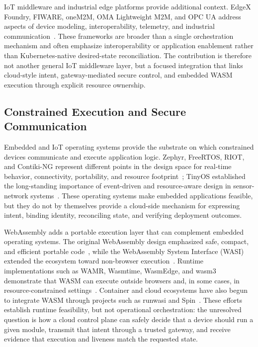 IoT middleware and industrial edge platforms provide additional context. EdgeX Foundry, FIWARE, oneM2M, OMA Lightweight M2M, and OPC UA address aspects of device modeling, interoperability, telemetry, and industrial communication~\cite{edgex,fiware,onem2m,lwm2m,opcua}. These frameworks are broader than a single orchestration mechanism and often emphasize interoperability or application enablement rather than Kubernetes-native desired-state reconciliation. The contribution is therefore not another general IoT middleware layer, but a focused integration that links cloud-style intent, gateway-mediated secure control, and embedded WASM execution through explicit resource ownership.

\subsection{Constrained Execution and Secure Communication}
Embedded and IoT operating systems provide the substrate on which constrained devices communicate and execute application logic. Zephyr, FreeRTOS, RIOT, and Contiki-NG represent different points in the design space for real-time behavior, connectivity, portability, and resource footprint~\cite{zephyr,freertos,riot,contiki}; TinyOS established the long-standing importance of event-driven and resource-aware design in sensor-network systems~\cite{tinyos}. These operating systems make embedded applications feasible, but they do not by themselves provide a cloud-side mechanism for expressing intent, binding identity, reconciling state, and verifying deployment outcomes.

WebAssembly adds a portable execution layer that can complement embedded operating systems. The original WebAssembly design emphasized safe, compact, and efficient portable code~\cite{haas_wasm,wasm_core}, while the WebAssembly System Interface (WASI) extended the ecosystem toward non-browser execution~\cite{wasi}. Runtime implementations such as WAMR, Wasmtime, WasmEdge, and wasm3 demonstrate that WASM can execute outside browsers and, in some cases, in resource-constrained settings~\cite{wamr,wasmtime,wasmedge,wasm3}. Container and cloud ecosystems have also begun to integrate WASM through projects such as runwasi and Spin~\cite{runwasi,spin}. These efforts establish runtime feasibility, but not operational orchestration: the unresolved question is how a cloud control plane can safely decide that a device should run a given module, transmit that intent through a trusted gateway, and receive evidence that execution and liveness match the requested state.

